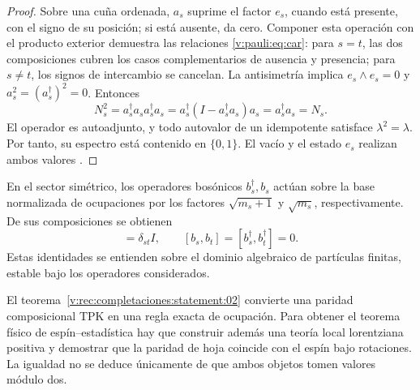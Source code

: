 \begin{proof}
Sobre una cuña ordenada, \(a_s\) suprime el factor \(e_s\), cuando está
presente, con el signo de su posición; si está ausente, da cero. Componer
esta operación con el producto exterior demuestra las relaciones
\eqref{v:pauli:eq:car}: para \(s=t\), las dos composiciones cubren los casos
complementarios de ausencia y presencia; para \(s\ne t\), los signos de
intercambio se cancelan. La antisimetría implica
\(e_s\wedge e_s=0\) y
\(a_s^2=(a_s^\dagger)^2=0\). Entonces
\begin{equation}
 N_s^2=a_s^\dagger a_s a_s^\dagger a_s
 =a_s^\dagger(I-a_s^\dagger a_s)a_s
 =a_s^\dagger a_s=N_s.
 \label{v:pauli:eq:prueba-idempotencia}
\end{equation}
El operador es autoadjunto, y todo autovalor de un idempotente satisface
\(\lambda^2=\lambda\). Por tanto, su espectro está contenido en
\(\{0,1\}\). El vacío y el estado \(e_s\) realizan ambos valores
\cite{Pauli1925,Dirac1926}.
\end{proof}

En el sector simétrico, los operadores bosónicos \(b_s^\dagger,b_s\)
actúan sobre la base normalizada de ocupaciones por los factores
\(\sqrt{m_s+1}\) y \(\sqrt{m_s}\), respectivamente. De sus composiciones
se obtienen
\begin{equation}
 [b_s,b_t^\dagger]=\delta_{st}I,
 \qquad [b_s,b_t]=[b_s^\dagger,b_t^\dagger]=0.
 \label{v:pauli:eq:ccr}
\end{equation}
Estas identidades se entienden sobre el dominio algebraico de partículas
finitas, estable bajo los operadores considerados.

El teorema~\ref{v:rec:completaciones:statement:02} convierte una paridad composicional TPK en una regla exacta de
ocupación. Para obtener el teorema físico de espín--estadística hay que
construir además una teoría local lorentziana positiva y demostrar que la
paridad de hoja coincide con el espín bajo rotaciones. La igualdad no se
deduce únicamente de que ambos objetos tomen valores módulo dos.
